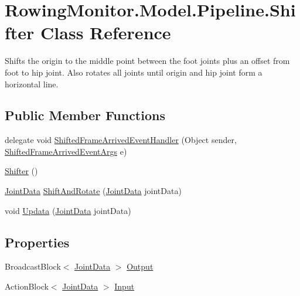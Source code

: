 \hypertarget{class_rowing_monitor_1_1_model_1_1_pipeline_1_1_shifter}{}\section{Rowing\+Monitor.\+Model.\+Pipeline.\+Shifter Class Reference}
\label{class_rowing_monitor_1_1_model_1_1_pipeline_1_1_shifter}


Shifts the origin to the middle point between the foot joints plus an offset from foot to hip joint. Also rotates all joints until origin and hip joint form a horizontal line.  


\subsection*{Public Member Functions}
\begin{DoxyCompactItemize}
\item 
delegate void \hyperlink{class_rowing_monitor_1_1_model_1_1_pipeline_1_1_shifter_a348927ce21661a1658060d083a91bd61}{Shifted\+Frame\+Arrived\+Event\+Handler} (Object sender, \hyperlink{class_rowing_monitor_1_1_model_1_1_shifted_frame_arrived_event_args}{Shifted\+Frame\+Arrived\+Event\+Args} e)
\item 
\hyperlink{class_rowing_monitor_1_1_model_1_1_pipeline_1_1_shifter_a22e7862fcbc55f78166971743aba7a94}{Shifter} ()
\item 
\hyperlink{struct_rowing_monitor_1_1_model_1_1_util_1_1_joint_data}{Joint\+Data} \hyperlink{class_rowing_monitor_1_1_model_1_1_pipeline_1_1_shifter_ac48bc7448590a3926823feb882fa9042}{Shift\+And\+Rotate} (\hyperlink{struct_rowing_monitor_1_1_model_1_1_util_1_1_joint_data}{Joint\+Data} joint\+Data)
\item 
void \hyperlink{class_rowing_monitor_1_1_model_1_1_pipeline_1_1_shifter_ae34f476a6eee98adea44c3e0e72d6e70}{Updata} (\hyperlink{struct_rowing_monitor_1_1_model_1_1_util_1_1_joint_data}{Joint\+Data} joint\+Data)
\end{DoxyCompactItemize}
\subsection*{Properties}
\begin{DoxyCompactItemize}
\item 
Broadcast\+Block$<$ \hyperlink{struct_rowing_monitor_1_1_model_1_1_util_1_1_joint_data}{Joint\+Data} $>$ \hyperlink{class_rowing_monitor_1_1_model_1_1_pipeline_1_1_shifter_a6d1edcd6586e11141863498c7bddfc13}{Output}
\item 
Action\+Block$<$ \hyperlink{struct_rowing_monitor_1_1_model_1_1_util_1_1_joint_data}{Joint\+Data} $>$ \hyperlink{class_rowing_monitor_1_1_model_1_1_pipeline_1_1_shifter_aa404f3bb229b6f57e5144f2a5c67bb43}{Input}
\end{DoxyCompactItemize}
